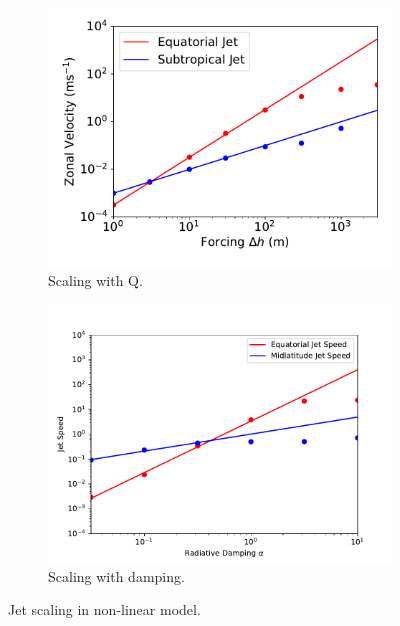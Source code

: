 \begin{figure}
  \centering
  \begin{subfigure}[t]{0.45\textwidth}
    \includegraphics[width=\textwidth]{figures/eqm-zonal-flow/u_Q_scaling.pdf}
    \caption{Scaling with Q.}
  \end{subfigure}
  \begin{subfigure}[t]{0.45\textwidth}
    \includegraphics[width=\textwidth]{figures/eqm-zonal-flow/u_alpha_scaling.pdf}
    \caption{Scaling with damping.}
  \end{subfigure}
  \caption{Jet scaling in non-linear model.}
  \label{fig:nonlin-u-scaling}
\end{figure}


